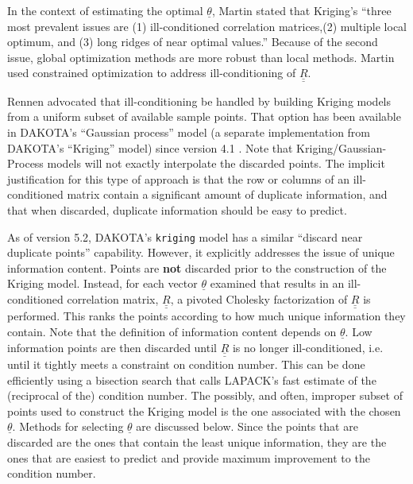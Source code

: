 In the context of estimating the optimal $\underline{\theta}$,
Martin \cite{Mar09} stated that Kriging's
``three most prevalent issues are (1) ill-conditioned correlation 
matrices,(2) multiple local optimum, and (3) long ridges of near 
optimal values.'' Because of the second issue, global optimization 
methods are more robust than local methods.  Martin used constrained 
optimization to address ill-conditioning of $\underline{\underline{R}}$.
\newline

Rennen \cite{Ren09} advocated that ill-conditioning
be handled by building Kriging models from a uniform subset of 
available sample points.  That option has been available in
DAKOTA's ``Gaussian process'' model (a separate implementation 
from DAKOTA's ``Kriging'' model) since version 4.1 \cite{Eld07}. 
Note that Kriging/Gaussian-Process models 
will not exactly interpolate the discarded points.  The implicit 
justification for this type of approach is that the row or columns of 
an ill-conditioned matrix contain a significant amount of duplicate 
information, and that when discarded, duplicate information should be 
easy to predict.\newline  

As of version 5.2, DAKOTA's \texttt{kriging} model has a similar 
``discard near duplicate points'' capability.  However, it explicitly
addresses the issue of unique information content.  Points are {\bf not} 
discarded prior to the construction of the Kriging model.  Instead,
for each vector $\underline{\theta}$ examined that results in an 
ill-conditioned correlation matrix, $\underline{\underline{R}}$,
a pivoted Cholesky factorization of $\underline{\underline{R}}$ is 
performed.  This ranks the points according to how much unique 
information they contain.  Note that the definition of information
content depends on $\underline{\theta}$.  Low information points are 
then discarded until $\underline{\underline{R}}$ is no longer 
ill-conditioned, i.e. until it tightly meets a constraint on 
condition number.  This can be done efficiently using a bisection 
search that calls LAPACK's fast estimate of the (reciprocal of the) 
condition number.  The possibly, and often, improper subset of points 
used to construct the Kriging model is the one associated with the 
chosen $\underline{\theta}$.  Methods for selecting $\underline{\theta}$ 
are discussed below.  Since the points that are discarded are the ones 
that contain the least unique information, they are the ones that are 
easiest to predict and provide maximum improvement to the condition number.
\newline


